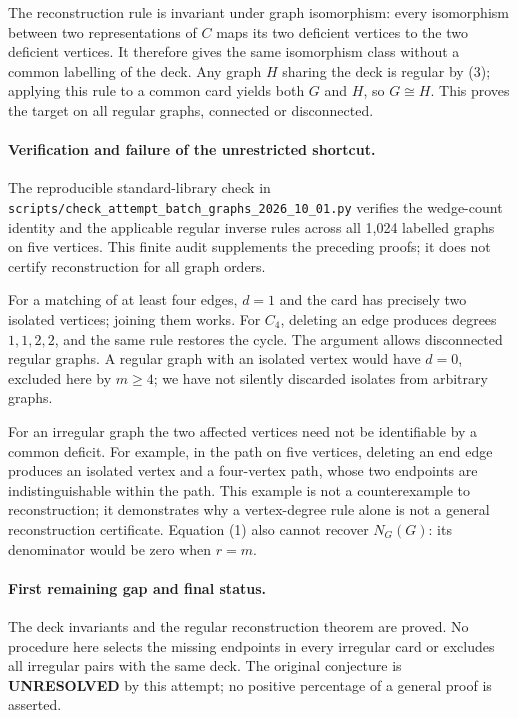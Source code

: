 \documentclass[11pt,a4paper]{article}
\begin{document}
The reconstruction rule is invariant under graph isomorphism: every isomorphism between two representations of $C$ maps its two deficient vertices to the two deficient vertices. It therefore gives the same isomorphism class without a common labelling of the deck. Any graph $H$ sharing the deck is regular by (3); applying this rule to a common card yields both $G$ and $H$, so $G\cong H$. This proves the target on all regular graphs, connected or disconnected.

\paragraph{Verification and failure of the unrestricted shortcut.}
The reproducible standard-library check in \texttt{scripts/check\_attempt\_batch\_graphs\_2026\_10\_01.py} verifies the wedge-count identity and the applicable regular inverse rules across all 1,024 labelled graphs on five vertices. This finite audit supplements the preceding proofs; it does not certify reconstruction for all graph orders.

For a matching of at least four edges, $d=1$ and the card has precisely two isolated vertices; joining them works. For $C_4$, deleting an edge produces degrees $1,1,2,2$, and the same rule restores the cycle. The argument allows disconnected regular graphs. A regular graph with an isolated vertex would have $d=0$, excluded here by $m\ge4$; we have not silently discarded isolates from arbitrary graphs.

For an irregular graph the two affected vertices need not be identifiable by a common deficit. For example, in the path on five vertices, deleting an end edge produces an isolated vertex and a four-vertex path, whose two endpoints are indistinguishable within the path. This example is not a counterexample to reconstruction; it demonstrates why a vertex-degree rule alone is not a general reconstruction certificate. Equation (1) also cannot recover $N_G(G)$: its denominator would be zero when $r=m$.

\paragraph{First remaining gap and final status.}
The deck invariants and the regular reconstruction theorem are proved. No procedure here selects the missing endpoints in every irregular card or excludes all irregular pairs with the same deck. The original conjecture is \textbf{UNRESOLVED} by this attempt; no positive percentage of a general proof is asserted.
\end{document}
